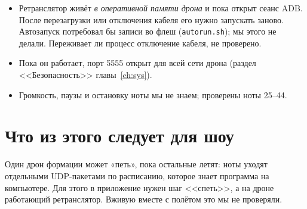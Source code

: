 \begin{vnimanie}[Ограничения]
\begin{itemize}
  \item Ретранслятор живёт \emph{в оперативной памяти дрона} и пока открыт сеанс ADB. После перезагрузки или отключения кабеля его нужно запускать заново. Автозапуск потребовал бы записи во флеш (\texttt{autorun.sh}); мы этого не делали. Переживает ли процесс отключение кабеля, не проверено. \nei{}
  \item Пока он работает, порт 5555 открыт для всей сети дрона (раздел <<Безопасность>> главы~\ref{ch:sys}).
  \item Громкость, паузы и остановку ноты мы не знаем; проверены ноты 25--44.
\end{itemize}
\end{vnimanie}

\section{Что из этого следует для шоу}

Один дрон формации может «петь», пока остальные летят: ноты уходят отдельными UDP-пакетами по расписанию, которое знает программа на компьютере. Для этого в приложение нужен шаг <<спеть>>, а на дроне работающий ретранслятор. Вживую вместе с полётом это мы не проверяли. \vyv{}
